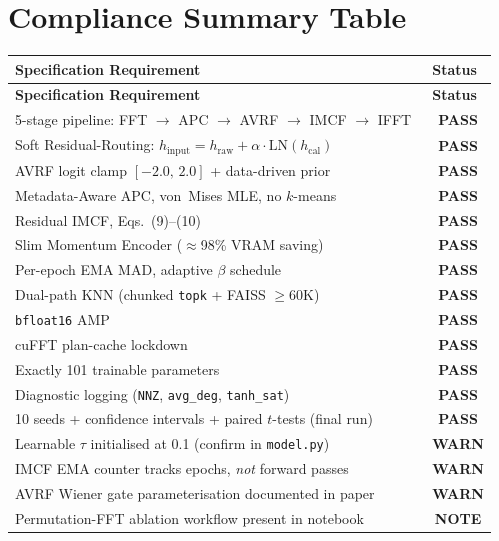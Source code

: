 \documentclass[12pt,a4paper]{article}
\newcommand{\PASS}{\textcolor{passgreen}{\ding{51}~\textbf{PASS}}}
\newcommand{\WARN}{\textcolor{warnambr}{\ding{115}~\textbf{WARN}}}
\newcommand{\INFO}{\textcolor{infoblue}{\ding{117}~\textbf{NOTE}}}
\begin{document}
\section{Compliance Summary Table}

\renewcommand{\arraystretch}{1.3}
\begin{longtable}{p{9.2cm} c}
  \toprule
  \textbf{Specification Requirement} & \textbf{Status} \\
  \midrule
  \endfirsthead
  \toprule
  \textbf{Specification Requirement} & \textbf{Status} \\
  \midrule
  \endhead
  \bottomrule
  \endlastfoot

  5-stage pipeline: FFT $\to$ APC $\to$ AVRF $\to$ IMCF $\to$ IFFT          & \PASS \\
  Soft Residual-Routing: $h_{\mathrm{input}} = h_{\mathrm{raw}} + \alpha \cdot \mathrm{LN}(h_{\mathrm{cal}})$ & \PASS \\
  AVRF logit clamp $[-2.0,\,2.0]$ + data-driven prior                         & \PASS \\
  Metadata-Aware APC, von~Mises MLE, no $k$-means                              & \PASS \\
  Residual IMCF, Eqs.~(9)--(10)                                                & \PASS \\
  Slim Momentum Encoder ($\approx$98\% VRAM saving)                            & \PASS \\
  Per-epoch EMA MAD, adaptive $\beta$ schedule                                 & \PASS \\
  Dual-path KNN (chunked \texttt{topk} + FAISS $\ge 60\text{K}$)              & \PASS \\
  \texttt{bfloat16} AMP                                                        & \PASS \\
  cuFFT plan-cache lockdown                                                     & \PASS \\
  Exactly 101 trainable parameters                                              & \PASS \\
  Diagnostic logging (\texttt{NNZ}, \texttt{avg\_deg}, \texttt{tanh\_sat})     & \PASS \\
  10 seeds + confidence intervals + paired $t$-tests (final run)               & \PASS \\[4pt]

  Learnable $\tau$ initialised at 0.1 (confirm in \texttt{model.py})          & \WARN \\
  IMCF EMA counter tracks epochs, \emph{not} forward passes                    & \WARN \\
  AVRF Wiener gate parameterisation documented in paper                         & \WARN \\
  Permutation-FFT ablation workflow present in notebook                         & \INFO \\

\end{longtable}
\end{document}
